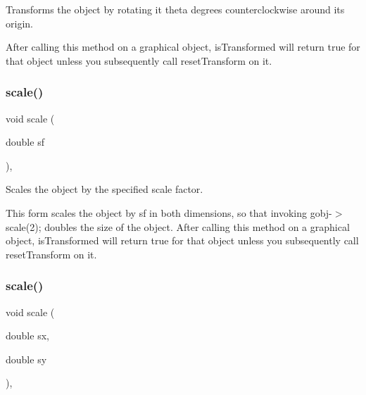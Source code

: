 Transforms the object by rotating it {\ttfamily theta} degrees counterclockwise around its origin. 

After calling this method on a graphical object, {\ttfamily is\+Transformed} will return {\ttfamily true} for that object unless you subsequently call {\ttfamily reset\+Transform} on it. \mbox{\label{classsgl_1_1GObject_ad2e1900f730475c2d044817db03b38d6}} 
\subsubsection{\texorpdfstring{scale()}{scale()}\hspace{0.1cm}{\footnotesize\ttfamily [1/2]}}
{\footnotesize\ttfamily void scale (\begin{DoxyParamCaption}\item[{double}]{sf }\end{DoxyParamCaption})\hspace{0.3cm}{\ttfamily [virtual]}, {\ttfamily [inherited]}}



Scales the object by the specified scale factor. 

This form scales the object by {\ttfamily sf} in both dimensions, so that invoking {\ttfamily gobj-\/$>$scale(2);} doubles the size of the object. After calling this method on a graphical object, {\ttfamily is\+Transformed} will return {\ttfamily true} for that object unless you subsequently call {\ttfamily reset\+Transform} on it. \mbox{\label{classsgl_1_1GObject_a63641f69d610d0b951357d35a0c3b1e3}} 
\subsubsection{\texorpdfstring{scale()}{scale()}\hspace{0.1cm}{\footnotesize\ttfamily [2/2]}}
{\footnotesize\ttfamily void scale (\begin{DoxyParamCaption}\item[{double}]{sx,  }\item[{double}]{sy }\end{DoxyParamCaption})\hspace{0.3cm}{\ttfamily [virtual]}, {\ttfamily [inherited]}}



